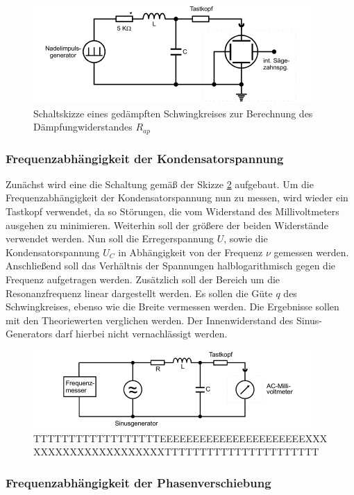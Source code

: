 \begin{figure}[H]
  \centering
  \includegraphics{content/aufgabeB.png}
  \caption{Schaltskizze eines gedämpften Schwingkreises zur Berechnung des Dämpfungwiderstandes $R_{ap}$}
  \label{fig:gsk3}
\end{figure}


\subsubsection{Frequenzabhängigkeit der Kondensatorspannung}

Zunächst wird eine die Schaltung gemäß der Skizze \ref{fig:gsk4} aufgebaut. Um die Frequenzabhängigkeit 
der Kondensatorspannung nun zu messen, wird wieder ein Tastkopf verwendet, da so Störungen, die vom Widerstand
des Millivoltmeters ausgehen zu minimieren. Weiterhin soll der größere der beiden Widerstände verwendet werden.
Nun soll die Erregerspannung $U$, sowie die Kondensatorspannung $U_C$ in Abhängigkeit von der Frequenz $\nu$
gemessen werden. Anschließend soll das Verhältnis der Spannungen halblogarithmisch gegen die Frequenz aufgetragen werden.
Zusätzlich soll der Bereich um die Resonanzfrequenz linear dargestellt werden. Es sollen die Güte $q$ des
Schwingkreises, ebenso wie die Breite vermessen werden. Die Ergebnisse sollen mit den Theoriewerten 
verglichen werden. Der Innenwiderstand des Sinus-Generators darf hierbei nicht vernachlässigt werden.

\begin{figure}[H]
  \centering
  \includegraphics{content/aufgabeC.png}
  \caption{TTTTTTTTTTTTTTTTTTEEEEEEEEEEEEEEEEEEEEEEXXXXXXXXXXXXXXXXXXXXXTTTTTTTTTTTTTTTTTTTTTT}
  \label{fig:gsk4}
\end{figure}


\subsubsection{Frequenzabhängigkeit der Phasenverschiebung}

